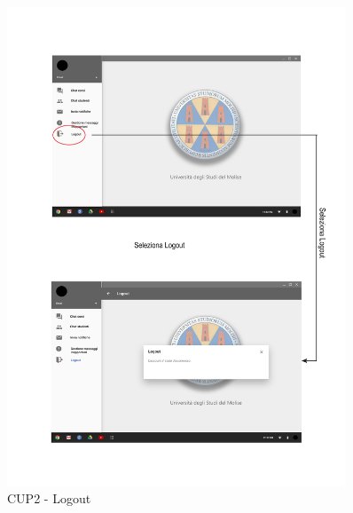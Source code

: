 \begin{figure}
	\centering
	\includegraphics[width=0.9\textwidth]{imgs/gruppo6/activities/act_cup2_logout.pdf}
	\caption{CUP2 - Logout}
	\label{fig:act-cup2}
\end{figure}

